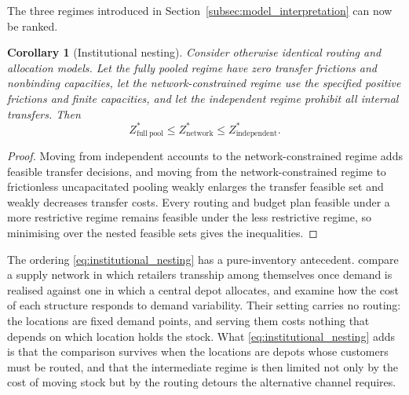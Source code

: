 \documentclass[authoryear,final,3p,times]{elsarticle}
\newtheorem{corollary}{Corollary}
\theoremstyle{definition}
\theoremstyle{plain}
\begin{document}
The three regimes introduced in
Section~\ref{subsec:model_interpretation} can now be ranked.

\begin{corollary}[Institutional nesting]
\label{cor:institutional_nesting}
Consider otherwise identical routing and allocation models.  Let the
fully pooled regime have zero transfer frictions and nonbinding capacities,
let the network-constrained regime use the specified positive frictions and
finite capacities, and let the independent regime prohibit all internal
transfers.  Then
\begin{equation}
Z_{\mathrm{full\ pool}}^*
\le Z_{\mathrm{network}}^*
\le Z_{\mathrm{independent}}^*.
\label{eq:institutional_nesting}
\end{equation}
\end{corollary}

\begin{proof}
Moving from independent accounts to the network-constrained regime adds
feasible transfer decisions, and moving from the network-constrained regime
to frictionless uncapacitated pooling weakly enlarges the transfer feasible set
and weakly decreases transfer costs.  Every routing and budget plan feasible
under a more restrictive regime remains feasible under the less restrictive
regime, so minimising over the nested feasible sets gives the inequalities.
\end{proof}

The ordering \eqref{eq:institutional_nesting} has a pure-inventory antecedent.
\citet{rosales2013retailer} compare a supply network in which retailers
transship among themselves once demand is realised against one in which a
central depot allocates, and examine how the cost of each structure responds to
demand variability.  Their setting carries no routing: the locations are fixed
demand points, and serving them costs nothing that depends on which location
holds the stock.  What \eqref{eq:institutional_nesting} adds is that the
comparison survives when the locations are depots whose customers must be
routed, and that the intermediate regime is then limited not only by the cost
of moving stock but by the routing detours the alternative channel requires.
\end{document}
